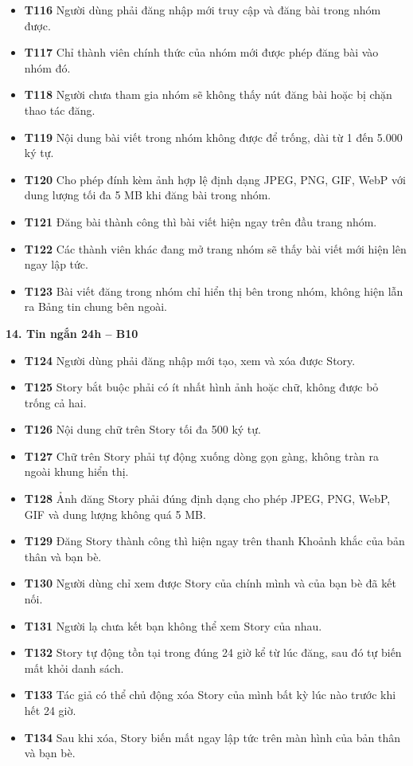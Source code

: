 \documentclass[11pt,a4paper]{article}
\begin{document}
\begin{itemize}[leftmargin=0.9cm, label=$\bullet$, itemsep=2pt, topsep=4pt]
    \item \textbf{T116} Người dùng phải đăng nhập mới truy cập và đăng bài trong nhóm được.
    \item \textbf{T117} Chỉ thành viên chính thức của nhóm mới được phép đăng bài vào nhóm đó.
    \item \textbf{T118} Người chưa tham gia nhóm sẽ không thấy nút đăng bài hoặc bị chặn thao tác đăng.
    \item \textbf{T119} Nội dung bài viết trong nhóm không được để trống, dài từ 1 đến 5.000 ký tự.
    \item \textbf{T120} Cho phép đính kèm ảnh hợp lệ định dạng JPEG, PNG, GIF, WebP với dung lượng tối đa 5 MB khi đăng bài trong nhóm.
    \item \textbf{T121} Đăng bài thành công thì bài viết hiện ngay trên đầu trang nhóm.
    \item \textbf{T122} Các thành viên khác đang mở trang nhóm sẽ thấy bài viết mới hiện lên ngay lập tức.
    \item \textbf{T123} Bài viết đăng trong nhóm chỉ hiển thị bên trong nhóm, không hiện lẫn ra Bảng tin chung bên ngoài.
\end{itemize}
\smallskip
\noindent\textbf{14. Tin ngắn 24h -- B10}
\begin{itemize}[leftmargin=0.9cm, label=$\bullet$, itemsep=2pt, topsep=4pt]
    \item \textbf{T124} Người dùng phải đăng nhập mới tạo, xem và xóa được Story.
    \item \textbf{T125} Story bắt buộc phải có ít nhất hình ảnh hoặc chữ, không được bỏ trống cả hai.
    \item \textbf{T126} Nội dung chữ trên Story tối đa 500 ký tự.
    \item \textbf{T127} Chữ trên Story phải tự động xuống dòng gọn gàng, không tràn ra ngoài khung hiển thị.
    \item \textbf{T128} Ảnh đăng Story phải đúng định dạng cho phép JPEG, PNG, WebP, GIF và dung lượng không quá 5 MB.
    \item \textbf{T129} Đăng Story thành công thì hiện ngay trên thanh Khoảnh khắc của bản thân và bạn bè.
    \item \textbf{T130} Người dùng chỉ xem được Story của chính mình và của bạn bè đã kết nối.
    \item \textbf{T131} Người lạ chưa kết bạn không thể xem Story của nhau.
    \item \textbf{T132} Story tự động tồn tại trong đúng 24 giờ kể từ lúc đăng, sau đó tự biến mất khỏi danh sách.
    \item \textbf{T133} Tác giả có thể chủ động xóa Story của mình bất kỳ lúc nào trước khi hết 24 giờ.
    \item \textbf{T134} Sau khi xóa, Story biến mất ngay lập tức trên màn hình của bản thân và bạn bè.
\end{itemize}
\end{document}

